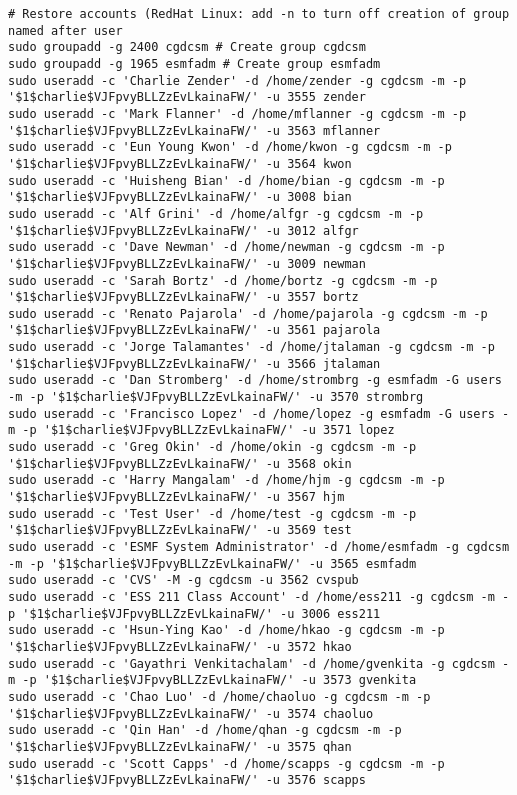 \documentclass[12pt,twoside]{article}
\begin{document}
\begin{verbatim}
# Restore accounts (RedHat Linux: add -n to turn off creation of group named after user
sudo groupadd -g 2400 cgdcsm # Create group cgdcsm
sudo groupadd -g 1965 esmfadm # Create group esmfadm
sudo useradd -c 'Charlie Zender' -d /home/zender -g cgdcsm -m -p '$1$charlie$VJFpvyBLLZzEvLkainaFW/' -u 3555 zender
sudo useradd -c 'Mark Flanner' -d /home/mflanner -g cgdcsm -m -p '$1$charlie$VJFpvyBLLZzEvLkainaFW/' -u 3563 mflanner
sudo useradd -c 'Eun Young Kwon' -d /home/kwon -g cgdcsm -m -p '$1$charlie$VJFpvyBLLZzEvLkainaFW/' -u 3564 kwon
sudo useradd -c 'Huisheng Bian' -d /home/bian -g cgdcsm -m -p '$1$charlie$VJFpvyBLLZzEvLkainaFW/' -u 3008 bian
sudo useradd -c 'Alf Grini' -d /home/alfgr -g cgdcsm -m -p '$1$charlie$VJFpvyBLLZzEvLkainaFW/' -u 3012 alfgr
sudo useradd -c 'Dave Newman' -d /home/newman -g cgdcsm -m -p '$1$charlie$VJFpvyBLLZzEvLkainaFW/' -u 3009 newman
sudo useradd -c 'Sarah Bortz' -d /home/bortz -g cgdcsm -m -p '$1$charlie$VJFpvyBLLZzEvLkainaFW/' -u 3557 bortz
sudo useradd -c 'Renato Pajarola' -d /home/pajarola -g cgdcsm -m -p '$1$charlie$VJFpvyBLLZzEvLkainaFW/' -u 3561 pajarola
sudo useradd -c 'Jorge Talamantes' -d /home/jtalaman -g cgdcsm -m -p '$1$charlie$VJFpvyBLLZzEvLkainaFW/' -u 3566 jtalaman
sudo useradd -c 'Dan Stromberg' -d /home/strombrg -g esmfadm -G users -m -p '$1$charlie$VJFpvyBLLZzEvLkainaFW/' -u 3570 strombrg
sudo useradd -c 'Francisco Lopez' -d /home/lopez -g esmfadm -G users -m -p '$1$charlie$VJFpvyBLLZzEvLkainaFW/' -u 3571 lopez
sudo useradd -c 'Greg Okin' -d /home/okin -g cgdcsm -m -p '$1$charlie$VJFpvyBLLZzEvLkainaFW/' -u 3568 okin
sudo useradd -c 'Harry Mangalam' -d /home/hjm -g cgdcsm -m -p '$1$charlie$VJFpvyBLLZzEvLkainaFW/' -u 3567 hjm
sudo useradd -c 'Test User' -d /home/test -g cgdcsm -m -p '$1$charlie$VJFpvyBLLZzEvLkainaFW/' -u 3569 test
sudo useradd -c 'ESMF System Administrator' -d /home/esmfadm -g cgdcsm -m -p '$1$charlie$VJFpvyBLLZzEvLkainaFW/' -u 3565 esmfadm
sudo useradd -c 'CVS' -M -g cgdcsm -u 3562 cvspub
sudo useradd -c 'ESS 211 Class Account' -d /home/ess211 -g cgdcsm -m -p '$1$charlie$VJFpvyBLLZzEvLkainaFW/' -u 3006 ess211
sudo useradd -c 'Hsun-Ying Kao' -d /home/hkao -g cgdcsm -m -p '$1$charlie$VJFpvyBLLZzEvLkainaFW/' -u 3572 hkao
sudo useradd -c 'Gayathri Venkitachalam' -d /home/gvenkita -g cgdcsm -m -p '$1$charlie$VJFpvyBLLZzEvLkainaFW/' -u 3573 gvenkita
sudo useradd -c 'Chao Luo' -d /home/chaoluo -g cgdcsm -m -p '$1$charlie$VJFpvyBLLZzEvLkainaFW/' -u 3574 chaoluo
sudo useradd -c 'Qin Han' -d /home/qhan -g cgdcsm -m -p '$1$charlie$VJFpvyBLLZzEvLkainaFW/' -u 3575 qhan
sudo useradd -c 'Scott Capps' -d /home/scapps -g cgdcsm -m -p '$1$charlie$VJFpvyBLLZzEvLkainaFW/' -u 3576 scapps

\end{verbatim}
\end{document}
